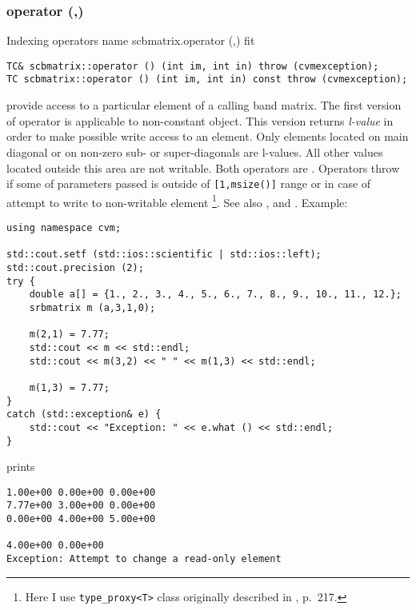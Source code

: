 \subsubsection{operator (,)}
Indexing operators%
\pdfdest name {scbmatrix.operator (,)} fit
\begin{verbatim}
TC& scbmatrix::operator () (int im, int in) throw (cvmexception);
TC scbmatrix::operator () (int im, int in) const throw (cvmexception);
\end{verbatim}
provide access to a particular element of a calling band matrix. The first version
of operator is applicable to non-constant object.
This version returns  \emph{l-value}
in order to make possible write access to an element.
Only elements located on main diagonal or on non-zero
sub- or super-diagonals are l-values. All other values
located outside this area are not writable.
Both operators are \Based.
Operators throw 
if some of parameters passed
is outside of \verb"[1,msize()]" range or
in case of attempt to write to  non-writable element%
\footnote{Here I use \verb"type_proxy<T>" class originally
described in , p.~217.}.
See also ,
 and
.
Example:
\begin{Verbatim}
using namespace cvm;

std::cout.setf (std::ios::scientific | std::ios::left); 
std::cout.precision (2);
try {
    double a[] = {1., 2., 3., 4., 5., 6., 7., 8., 9., 10., 11., 12.};
    srbmatrix m (a,3,1,0);

    m(2,1) = 7.77;
    std::cout << m << std::endl;
    std::cout << m(3,2) << " " << m(1,3) << std::endl;

    m(1,3) = 7.77;
}
catch (std::exception& e) {
    std::cout << "Exception: " << e.what () << std::endl;
}
\end{Verbatim}
prints
\begin{Verbatim}
1.00e+00 0.00e+00 0.00e+00
7.77e+00 3.00e+00 0.00e+00
0.00e+00 4.00e+00 5.00e+00

4.00e+00 0.00e+00
Exception: Attempt to change a read-only element
\end{Verbatim}
\newpage




